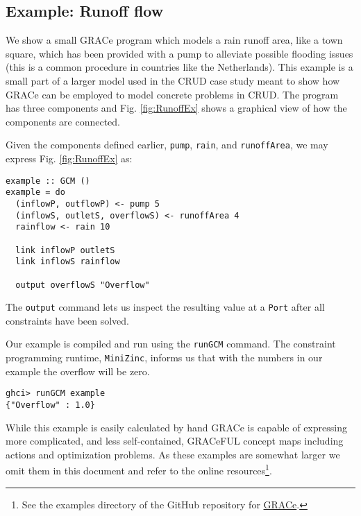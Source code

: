 \subsection{Example: Runoff flow}
\label{example-runoff-flow}

We show a small GRACe program which models a rain runoff area, like a
town square, which has been provided with a pump to alleviate possible
flooding issues (this is a common procedure in countries like the
Netherlands).
%
This example is a small part of a larger model used in the CRUD case
study meant to show how GRACe can be employed to model concrete problems
in CRUD.
%
The program has three components and Fig. \ref{fig:RunoffEx} shows a
graphical view of how the components are connected.
%

Given the components defined earlier, \texttt{pump}, \texttt{rain}, and \texttt{runoffArea},
we may express Fig. \ref{fig:RunoffEx} as:
\begin{verbatim}
example :: GCM ()
example = do
  (inflowP, outflowP) <- pump 5
  (inflowS, outletS, overflowS) <- runoffArea 4
  rainflow <- rain 10

  link inflowP outletS
  link inflowS rainflow

  output overflowS "Overflow"
\end{verbatim}
The \texttt{output} command lets us inspect the resulting value at a \texttt{Port}
after all constraints have been solved.

Our example is compiled and run using the \texttt{runGCM} command.
%
The constraint programming runtime, \texttt{MiniZinc}, informs us
that with the numbers in our example the overflow will be zero.

\begin{verbatim}
ghci> runGCM example
{"Overflow" : 1.0}
\end{verbatim}

While this example is easily calculated by hand GRACe is capable of
expressing more complicated, and less self-contained, GRACeFUL concept
maps including actions and optimization problems.
%
As these examples are somewhat larger we omit them in this document
and refer to the online resources\footnote{See the examples directory
  of the GitHub repository for
  \href{https://github.com/GRACeFUL-project/GRACe}{GRACe}.}.

